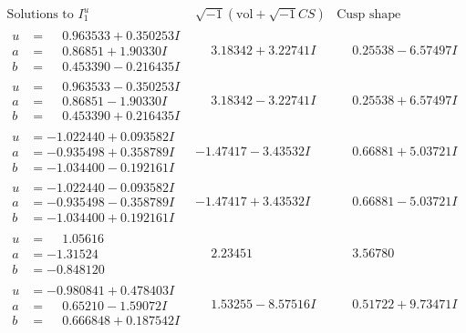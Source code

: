 \documentclass[1p]{elsarticle_modified}
\theoremstyle{definition}
\newcommand{\I}{\sqrt{-1}}
\begin{document}
$$\begin{array}{c|c|c}  
\text{Solutions to }I^u_{1}& \I (\text{vol} + \sqrt{-1}CS) & \text{Cusp shape}\\
 \hline 
\begin{aligned}
u &= \phantom{-}0.963533 + 0.350253 I \\
a &= \phantom{-}0.86851 + 1.90330 I \\
b &= \phantom{-}0.453390 - 0.216435 I\end{aligned}
 & \phantom{-}3.18342 + 3.22741 I & \phantom{-}0.25538 - 6.57497 I \\ \hline\begin{aligned}
u &= \phantom{-}0.963533 - 0.350253 I \\
a &= \phantom{-}0.86851 - 1.90330 I \\
b &= \phantom{-}0.453390 + 0.216435 I\end{aligned}
 & \phantom{-}3.18342 - 3.22741 I & \phantom{-}0.25538 + 6.57497 I \\ \hline\begin{aligned}
u &= -1.022440 + 0.093582 I \\
a &= -0.935498 + 0.358789 I \\
b &= -1.034400 - 0.192161 I\end{aligned}
 & -1.47417 - 3.43532 I & \phantom{-}0.66881 + 5.03721 I \\ \hline\begin{aligned}
u &= -1.022440 - 0.093582 I \\
a &= -0.935498 - 0.358789 I \\
b &= -1.034400 + 0.192161 I\end{aligned}
 & -1.47417 + 3.43532 I & \phantom{-}0.66881 - 5.03721 I \\ \hline\begin{aligned}
u &= \phantom{-}1.05616\phantom{ +0.000000I} \\
a &= -1.31524\phantom{ +0.000000I} \\
b &= -0.848120\phantom{ +0.000000I}\end{aligned}
 & \phantom{-}2.23451\phantom{ +0.000000I} & \phantom{-}3.56780\phantom{ +0.000000I} \\ \hline\begin{aligned}
u &= -0.980841 + 0.478403 I \\
a &= \phantom{-}0.65210 - 1.59072 I \\
b &= \phantom{-}0.666848 + 0.187542 I\end{aligned}
 & \phantom{-}1.53255 - 8.57516 I & \phantom{-}0.51722 + 9.73471 I \\ \hline\begin{aligned}

\end{aligned}
\end{array}$$
\end{document}

